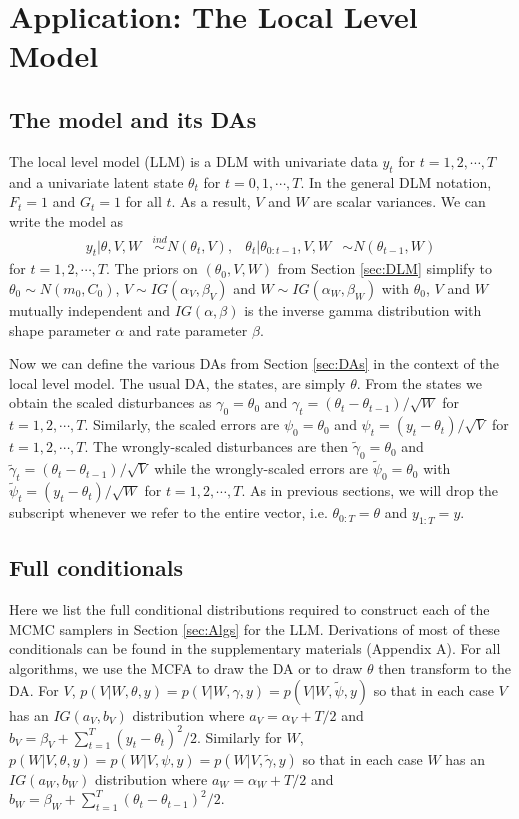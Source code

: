 \documentclass[12pt]{article}
\begin{document}
\section{Application: The Local Level Model}\label{sec:LLM}

\subsection{The model and its DAs}

The local level model (LLM) is a DLM with univariate data $y_t$ for $t=1,2,\cdots,T$ and a univariate latent state $\theta_t$ for $t=0,1,\cdots,T$. In the general DLM notation, $F_t=1$ and $G_t=1$ for all $t$. As a result, $V$ and $W$ are scalar variances. We can write the model as
\begin{align}
  y_t |\theta,V,W& \stackrel{ind}{\sim} N(\theta_t,V), &
  \theta_t |\theta_{0:t-1},V,W& \sim N(\theta_{t-1},W)
\end{align}
for $t=1,2,\cdots,T$. The priors on $(\theta_0,V,W)$ from Section \ref{sec:DLM} simplify to $\theta_0\sim N(m_0,C_0)$, $V\sim IG(\alpha_V,\beta_V)$ and $W\sim IG(\alpha_W,\beta_W)$ with $\theta_0$, $V$ and $W$ mutually independent and $IG(\alpha,\beta)$ is the inverse gamma distribution with shape parameter $\alpha$ and rate parameter $\beta$.

Now we can define the various DAs from Section \ref{sec:DAs} in the context of the local level model. The usual DA, the states, are simply $\theta$. From the states we obtain the scaled disturbances as $\gamma_0=\theta_0$ and $\gamma_t = (\theta_t - \theta_{t-1})/\sqrt{W}$ for $t=1,2,\cdots,T$. Similarly, the scaled errors are $\psi_0=\theta_0$ and $\psi_t = (y_t - \theta_t)/\sqrt{V}$ for $t=1,2,\cdots,T$. The wrongly-scaled disturbances are then $\tilde{\gamma}_{0}=\theta_0$ and $\tilde{\gamma}_t = (\theta_t - \theta_{t-1})/\sqrt{V}$ while the wrongly-scaled errors are $\tilde{\psi}_0=\theta_0$ with $\tilde{\psi}_t = (y_t - \theta_t)/\sqrt{W}$ for $t=1,2,\cdots,T$. As in previous sections, we will drop the subscript whenever we refer to the entire vector, i.e. $\theta_{0:T}=\theta$ and $y_{1:T}=y$.

\subsection{Full conditionals}\label{sec:LLM:fullcond}

Here we list the full conditional distributions required to construct each of the MCMC samplers in Section \ref{sec:Algs} for the LLM. Derivations of most of these conditionals can be found in the supplementary materials (Appendix A). For all algorithms, we use the MCFA to draw the DA or to draw $\theta$ then transform to the DA. For $V$, $p(V|W,\theta,y)=p(V|W,\gamma,y)=p(V|W,\tilde{\psi},y)$ so that in each case $V$ has an $IG(a_V,b_V)$ distribution where $a_V = \alpha_V + T/2$ and $b_V = \beta_V + \sum_{t=1}^T(y_t - \theta_t)^2/2$. Similarly for $W$, $p(W|V,\theta,y)=p(W|V,\psi,y)=p(W|V,\tilde{\gamma},y)$ so that in each case $W$ has an $IG(a_W, b_W)$ distribution where $a_W = \alpha_W + T/2$ and $b_W = \beta_W + \sum_{t=1}^T(\theta_t - \theta_{t-1})^2/2$.
\end{document}
